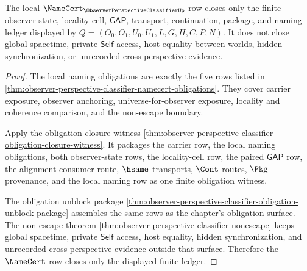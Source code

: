 \begin{theorem}
\label{thm:observer-perspective-classifier-namecert-ledger-scope}
The local $\NameCert_{\ObserverPerspectiveClassifierUp}$ row closes only the finite observer-state, locality-cell, $\mathsf{GAP}$, transport, continuation, package, and naming ledger displayed by $Q=(O_0,O_1,U_0,U_1,L,G,H,C,P,N)$. It does not close global spacetime, private $\mathsf{Self}$ access, host equality between worlds, hidden synchronization, or unrecorded cross-perspective evidence.
\end{theorem}
\begin{proof}
The local naming obligations are exactly the five rows listed in \autoref{thm:observer-perspective-classifier-namecert-obligations}. They cover carrier exposure, observer anchoring, universe-for-observer exposure, locality and coherence comparison, and the non-escape boundary.

Apply the obligation-closure witness \autoref{thm:observer-perspective-classifier-obligation-closure-witness}. It packages the carrier row, the local naming obligations, both observer-state rows, the locality-cell row, the paired $\mathsf{GAP}$ row, the alignment consumer route, $\hsame$ transports, $\Cont$ routes, $\Pkg$ provenance, and the local naming row as one finite obligation witness.

The obligation unblock package \autoref{thm:observer-perspective-classifier-obligation-unblock-package} assembles the same rows as the chapter's obligation surface. The non-escape theorem \autoref{thm:observer-perspective-classifier-nonescape} keeps global spacetime, private $\mathsf{Self}$ access, host equality, hidden synchronization, and unrecorded cross-perspective evidence outside that surface. Therefore the $\NameCert$ row closes only the displayed finite ledger.
\end{proof}

